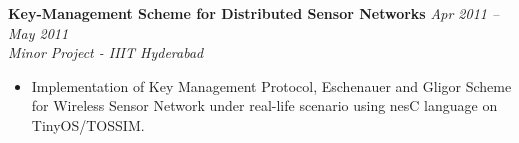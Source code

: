 \documentclass[margin,line]{resume}
\begin{document}
\begin{resume}
    \textbf{Key-Management Scheme for Distributed Sensor Networks} \hfill \textsl{Apr 2011 -- May 2011}\vspace{0mm}\\\vspace{0mm}%
    \textsl{Minor Project - IIIT Hyderabad} 
       \begin{itemize} 
            \item Implementation of Key Management Protocol, Eschenauer and Gligor Scheme for Wireless Sensor Network under real-life scenario using nesC language on TinyOS/TOSSIM.
       \end{itemize}


\end{resume}
\end{document}

